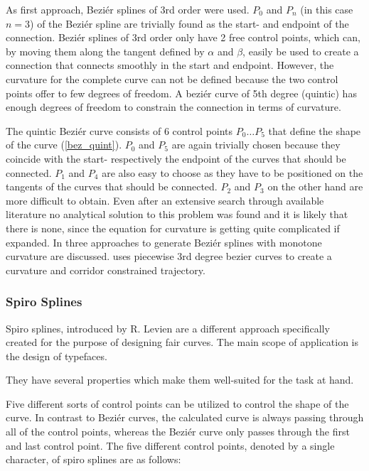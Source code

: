 As first approach, Beziér splines of 3rd order were used. $P_0$ and $P_n$ (in this case $n=3$) of the Beziér spline are trivially found as the start- and endpoint of the connection.  Beziér splines of 3rd order only have 2 free control points, which can, by moving them along the tangent defined by $\alpha$ and $\beta$, easily be used to create a connection that connects smoothly in the start and endpoint. However, the curvature for the complete curve can not be defined because the two control points offer to few degrees of freedom. A beziér curve of 5th degree (quintic) has enough degrees of freedom to constrain the connection in terms of curvature.

The quintic Beziér curve consists of 6 control points $P_0 \ldots P_5$ that define the shape of the curve (\autoref{bez_quint}). $P_0$ and $P_5$ are again trivially chosen because they coincide with the start- respectively the endpoint of the curves that should be connected. $P_1$ and $P_4$ are also easy to choose as they have to be positioned on the tangents of the curves that should be connected. $P_2$ and $P_3$ on the other hand are more difficult to obtain. Even after an extensive search through available literature no analytical solution to this problem was found and it is likely that there is none, since the equation for curvature is getting quite complicated if expanded. In \cite{doi:10.1137/1.9781611971521.ch5} three approaches to generate Beziér splines with monotone curvature are discussed. \cite{choi2010piecewise} uses piecewise 3rd degree bezier curves to create a curvature and corridor constrained trajectory.

\subsubsection{Spiro Splines}\label{sec:smoothspiro}

Spiro splines, introduced by R. Levien \cite{levien2009spiral} are a different approach specifically created for the purpose of designing fair curves. The main scope of application is the design of typefaces. 

They have several properties which make them well-suited for the task at hand.

Five different sorts of control points can be utilized to control the shape of the curve. In contrast to Beziér curves, the calculated curve is always passing through all of the control points, whereas the Beziér curve only passes through the first and last control point. The five different control points, denoted by a single character, of spiro splines are as follows:

